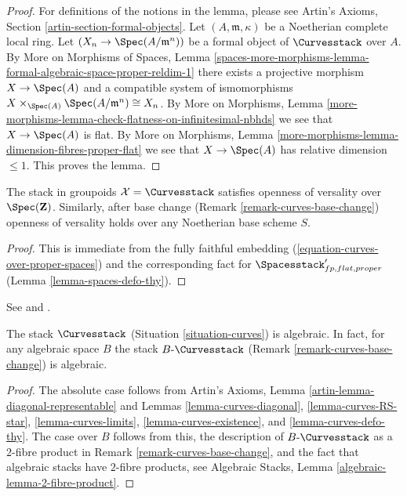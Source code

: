 \begin{proof}
For definitions of the notions in the lemma, please see
Artin's Axioms, Section \ref{artin-section-formal-objects}.
Let $(A, \mathfrak m, \kappa)$ be a Noetherian complete
local ring. Let $(X_n \to \Spec(A/\mathfrak m^n))$
be a formal object of $\Curvesstack$ over $A$.
By More on Morphisms of Spaces, Lemma
\ref{spaces-more-morphisms-lemma-formal-algebraic-space-proper-reldim-1}
there exists a projective morphism $X \to \Spec(A)$
and a compatible system of ismomorphisms
$X \times_{\Spec(A)} \Spec(A/\mathfrak m^n) \cong X_n$. By
More on Morphisms, Lemma
\ref{more-morphisms-lemma-check-flatness-on-infinitesimal-nbhds}
we see that $X \to \Spec(A)$ is flat. By More on Morphisms, Lemma
\ref{more-morphisms-lemma-dimension-fibres-proper-flat}
we see that $X \to \Spec(A)$ has relative dimension $\leq 1$.
This proves the lemma.
\end{proof}

\begin{lemma}
\label{lemma-curves-defo-thy}
The stack in groupoids $\mathcal{X} = \Curvesstack$
satisfies openness of versality over $\Spec(\mathbf{Z})$.
Similarly, after base change (Remark \ref{remark-curves-base-change})
openness of versality holds over any Noetherian base scheme $S$.
\end{lemma}

\begin{proof}
This is immediate from the fully faithful embedding
(\ref{equation-curves-over-proper-spaces}) and
the corresponding fact for $\Spacesstack'_{fp, flat, proper}$
(Lemma \ref{lemma-spaces-defo-thy}).
\end{proof}

\begin{theorem}
\label{theorem-curves-algebraic}
\begin{reference}
See \cite[Proposition 3.3, page 8]{dJHS} and
\cite[Appendix B by Jack Hall, Theorem B.1]{Smyth}.
\end{reference}
The stack $\Curvesstack$ (Situation \ref{situation-curves})
is algebraic. In fact, for any algebraic space $B$ the stack
$B\text{-}\Curvesstack$ (Remark \ref{remark-curves-base-change})
is algebraic.
\end{theorem}

\begin{proof}
The absolute case follows from
Artin's Axioms, Lemma \ref{artin-lemma-diagonal-representable}
and Lemmas \ref{lemma-curves-diagonal},
\ref{lemma-curves-RS-star},
\ref{lemma-curves-limits},
\ref{lemma-curves-existence}, and
\ref{lemma-curves-defo-thy}.
The case over $B$ follows from this, the description of
$B\text{-}\Curvesstack$ as a $2$-fibre product in
Remark \ref{remark-curves-base-change}, and the fact
that algebraic stacks have $2$-fibre products, see
Algebraic Stacks, Lemma \ref{algebraic-lemma-2-fibre-product}.
\end{proof}

